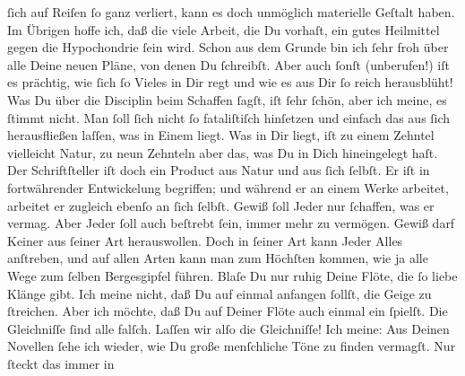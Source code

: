 \begin{ledgroupsized}[t]{13cm}
               ſich auf Reiſen ſo ganz verliert, kann es doch unmöglich materielle Geſtalt haben. Im
               Übrigen hoffe ich, daß die viele Arbeit, die Du vorhaſt, ein gutes Heilmittel gegen
               die Hypochondrie ſein wird. Schon aus dem Grunde {\pb}bin ich ſehr froh über alle Deine neuen Pläne, von denen Du ſchreibſt. Aber auch
               ſonſt (unberufen!) iſt es prächtig, wie ſich ſo \strikeout{\textcolor{gray}{V}} Vieles in Dir regt und wie es aus Dir ſo reich herausblüht!\pend
           \pstart
           Was Du über die Disciplin beim Schaffen ſagſt, iſt ſehr ſchön, aber ich meine, es
               ſtimmt nicht. Man ſoll ſich nicht ſo fataliſtiſch hinſetzen\strikeout{,} und einfach das aus ſich herausfließen laſſen, was in Einem liegt. Was in
               Dir liegt, iſt zu einem Zehntel vielleicht Natur, zu  neun Zehnteln aber das, was Du in Dich hineingelegt haſt. Der
               Schriftſteller iſt doch ein Product aus Natur und aus ſich ſelbſt. Er iſt in
               fortwährender Entwickelung begriffen; und {\pb}während
               er an einem Werke arbeitet, \strikeout{\textcolor{gray}{×}{ }\textcolor{gray}{arb}} arbeitet er zugleich ebenſo an ſich ſelbſt. Gewiß ſoll Jeder nur ſchaffen, was
               er vermag. Aber Jeder ſoll auch beſtrebt ſein, 
               immer mehr zu vermögen. Gewiß darf Keiner aus ſeiner Art herauswollen. Doch in ſeiner
               Art kann Jeder Alles anſtreben, und auf allen Arten kann man zum Höchſten kommen, wie
                   ja alle Wege zum ſelben Bergesgipfel führen.
               Blaſe Du nur ruhig Deine Flöte, die ſo liebe Klänge gibt. Ich meine  nicht, daß Du auf einmal anfangen ſollſt, die
               Geige zu ſtreichen. Aber ich möchte, daß Du auf Deiner Flöte auch  einmal ein \label{K_L02861-2v}\label{K_L02861-2h} ſpielſt. Die Gleichniſſe ſind alle falſch. Laſſen wir alſo die Gleichniſſe!
               Ich meine: Aus Deinen Novellen
               ſehe ich wieder,  wie Du große menſchliche Töne zu finden vermagſt. Nur ſteckt das immer in

\end{ledgroupsized}

